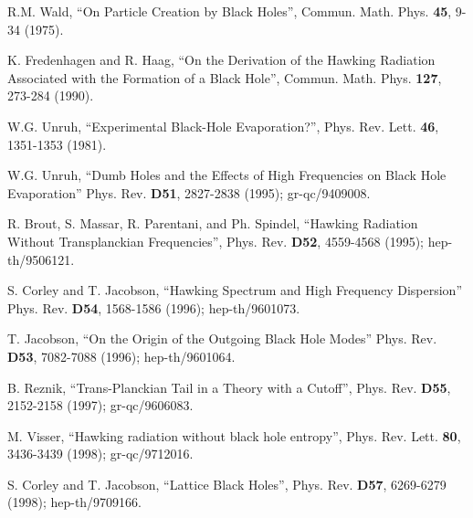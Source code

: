 \begin{thebibliography}{999}
 R.M. Wald, ``On Particle Creation by
Black Holes'', Commun. Math. Phys. {\bf 45}, 9-34 (1975).

 K. Fredenhagen and R. Haag, ``On the
Derivation of the Hawking Radiation Associated with the Formation of a
Black Hole'', Commun. Math. Phys. {\bf 127}, 273-284 (1990).

 W.G. Unruh, ``Experimental Black-Hole
Evaporation?'', Phys. Rev. Lett. {\bf 46}, 1351-1353 (1981).

 W.G. Unruh, ``Dumb Holes and the Effects
of High Frequencies on Black Hole Evaporation'' Phys. Rev. {\bf D51},
2827-2838 (1995); gr-qc/9409008.  

 R. Brout, S. Massar, R. Parentani, and
Ph. Spindel, ``Hawking Radiation Without Transplanckian Frequencies'',
Phys. Rev. {\bf D52}, 4559-4568 (1995); hep-th/9506121.

 S. Corley and T. Jacobson, ``Hawking
Spectrum and High Frequency Dispersion'' Phys. Rev. {\bf D54},
1568-1586 (1996); hep-th/9601073.  

 T. Jacobson, ``On the Origin of the
Outgoing Black Hole Modes'' Phys. Rev. {\bf D53}, 7082-7088 (1996);
hep-th/9601064.  

 B. Reznik, ``Trans-Planckian Tail in a
Theory with a Cutoff'', Phys. Rev. {\bf D55}, 2152-2158 (1997);
gr-qc/9606083.  

 M. Visser, ``Hawking radiation without
black hole entropy'', Phys. Rev. Lett. {\bf 80}, 3436-3439 (1998);
gr-qc/9712016.  

 S. Corley and T. Jacobson, ``Lattice
Black Holes'', Phys. Rev. {\bf D57}, 6269-6279 (1998); hep-th/9709166.


\end{thebibliography}
